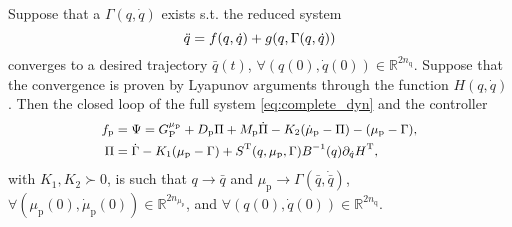 \begin{theo}
	Suppose that a $\Gamma(q,\dot{q})$ exists s.t. the reduced system
	\begin{equation}\small\label{eq:reduced_sys}
		\ddot{q} = f(q,\dot{q}) + g(q,\Gamma(q,\dot{q}))
	\end{equation}
	converges to a desired trajectory $\bar{q}(t)$, $\forall (q(0),\dot{q}(0)) \in \mathbb{R}^{2 n_{\mathrm{q}}}$. Suppose that the convergence is proven by Lyapunov arguments through the function $H(q,\dot{q})$. Then the closed loop of the full system \eqref{eq:complete_dyn} and the controller
	\begin{equation}\small\label{eq:pi_psi}
		\begin{split}
			f_\mathrm{p} &= \Psi = G_{\mathrm{P}}^{\mu_\mathrm{p}} + D_\mathrm{p} \Pi + M_\mathrm{p} \dot{\Pi} - K_2 (\dot{\mu}_\mathrm{p} - \Pi) - (\mu_\mathrm{p} - \Gamma),\\
			\Pi &= \dot{\Gamma} - K_1 (\mu_\mathrm{p} - \Gamma) 
			+ S^{\mathrm{T}}(q,\mu_\mathrm{p},\Gamma)B^{-1}(q)\partial_{\dot{q}} H^{\mathrm{T}},
		\end{split}
	\end{equation}
	with $K_1,K_2 \succ 0$, is such that $q \rightarrow \bar{q}$ and $\mu_\mathrm{p} \rightarrow \Gamma(\bar q,\dot{\bar q})$, $\forall (\mu_\mathrm{p}(0),\dot{\mu}_\mathrm{p}(0)) \in \mathbb{R}^{2n_{\mu_\mathrm{p}}}$, and $\forall (q(0),\dot{q}(0)) \in \mathbb{R}^{2 n_{\mathrm{q}}}$.
\end{theo}
